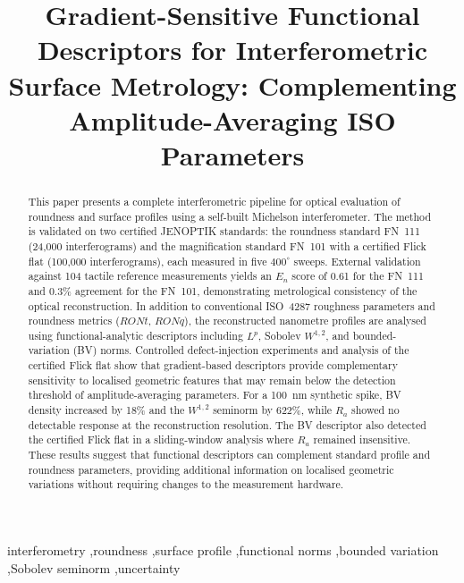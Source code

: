 \documentclass[review]{elsarticle}
\begin{document}
\begin{frontmatter}

\title{Gradient-Sensitive Functional Descriptors for Interferometric Surface Metrology: Complementing Amplitude-Averaging ISO Parameters}


\begin{abstract}
This paper presents a complete interferometric pipeline for optical evaluation of roundness and surface profiles using a self-built Michelson interferometer. The method is validated on two certified JENOPTIK standards: the roundness standard FN~111 (24,000 interferograms) and the magnification standard FN~101 with a certified Flick flat (100,000 interferograms), each measured in five $400^\circ$ sweeps. External validation against 104 tactile reference measurements yields an $E_n$ score of 0.61 for the FN~111 and 0.3\% agreement for the FN~101, demonstrating metrological consistency of the optical reconstruction. In addition to conventional ISO~4287 roughness parameters and roundness metrics ($RONt$, $RONq$), the reconstructed nanometre profiles are analysed using functional-analytic descriptors including $L^p$, Sobolev $W^{1,2}$, and bounded-variation (BV) norms. Controlled defect-injection experiments and analysis of the certified Flick flat show that gradient-based descriptors provide complementary sensitivity to localised geometric features that may remain below the detection threshold of amplitude-averaging parameters. For a 100~nm synthetic spike, BV density increased by 18\% and the $W^{1,2}$ seminorm by 622\%, while $R_a$ showed no detectable response at the reconstruction resolution. The BV descriptor also detected the certified Flick flat in a sliding-window analysis where $R_a$ remained insensitive. These results suggest that functional descriptors can complement standard profile and roundness parameters, providing additional information on localised geometric variations without requiring changes to the measurement hardware.
\end{abstract}

\begin{keyword}
interferometry \sep roundness \sep surface profile \sep functional norms \sep bounded variation \sep Sobolev seminorm \sep uncertainty
\end{keyword}

\end{frontmatter}
\end{document}
